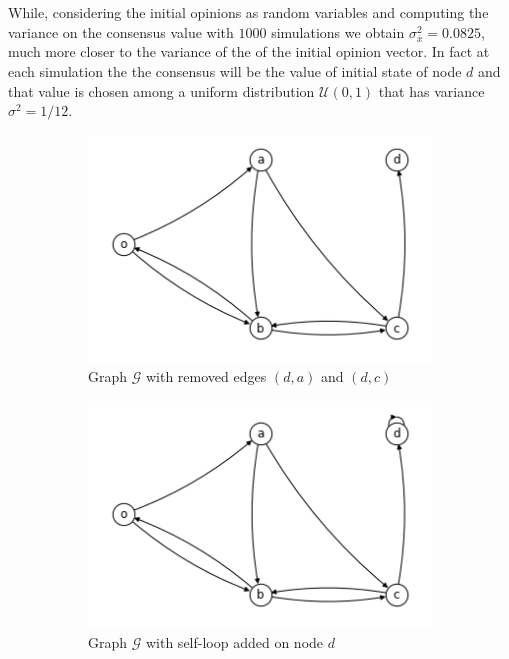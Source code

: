 \documentclass[
	12pt, %
]{fphw}
\begin{document}
\begin{enumerate}[(a\normalfont)]
    
    While, considering the initial opinions as random variables and computing the variance on the consensus value with $1000$ simulations we obtain $\sigma^2_{\overline{x}} = 0.0825$, much more closer to the variance of the of the initial opinion vector. 
    In fact at each simulation the the consensus will be the value of initial state of node $d$ and that value is chosen among a uniform distribution $\mathcal{U}(0,1)$ that has variance $\sigma^2 = 1/12$.
    
    \begin{figure}[H]
    \centering
        \begin{subfigure}{.5\textwidth}
            \centering
            \includegraphics[width=1\linewidth]{P1Ga.png}
            \caption{Graph $\mathcal{G}$ with removed edges $(d,a)$ and $(d,c)$}
            \label{fig:P1Ga}
        \end{subfigure}%
        \begin{subfigure}{.5\textwidth}
            \centering
            \includegraphics[width=1\linewidth]{P1Gb.png}
            \caption{Graph $\mathcal{G}$ with self-loop added on node $d$}
            \label{fig:P1Gb}
        \end{subfigure}
        \caption{}
        \label{fig:P1G}
    \end{figure}
    

\end{enumerate}
\end{document}
